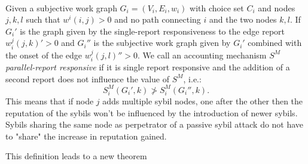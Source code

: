 \begin{definition}\ \\
\label{def:Parallel-Report Responsiveness}
\noindent{}Given a subjective work graph $G_i=(V_i,E_i,w_i)$ with choice set $C_i$ and nodes $j,k,l$ such that $w^i(i,j)>0$ and no path connecting $i$ and the two nodes $k,l$. If $G_i'$ is the graph given by the single-report responsiveness to the edge report $w^j_i(j,k)'>0$ and $G_i''$ is the subjective work graph given by $G_i'$ combined with the onset of the edge $w^j_i(j,l)''>0$. We call an accounting mechanism $S^M$ {\it parallel-report responsive} if it is single report responsive and the addition of a second report does not influence the value of $S^M$, i.e.:
\[
S^M_i(G_i',k)\not>S^M_i(G_i'',k).
\] 
\noindent{}This means that if node $j$ adds multiple sybil nodes, one after the other then the reputation of the sybils won't be influenced by the introduction of newer sybils. Sybils sharing the same node as perpetrator of a passive sybil attack do not have to "share" the increase in reputation gained.
\end{definition}

\noindent{}This definition leads to a new theorem

